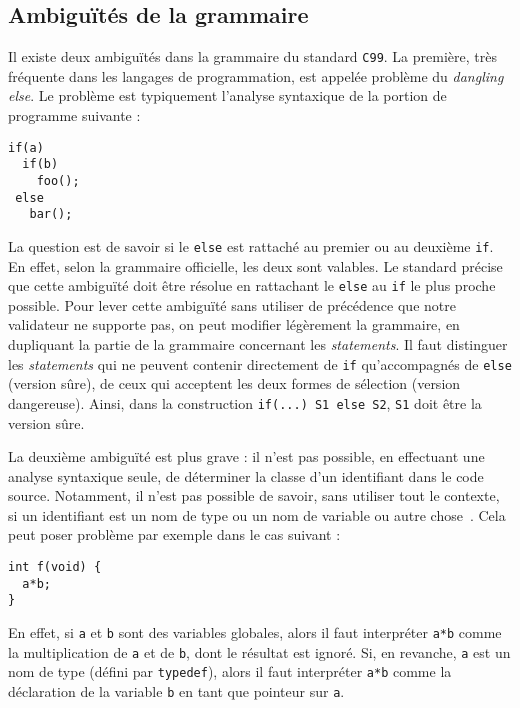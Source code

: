 \documentclass[a4paper,11pt]{article}
\begin{document}
\subsection{Ambiguïtés de la grammaire}

Il existe deux ambiguïtés dans la grammaire du standard \texttt{C99}. La
première, très fréquente dans les langages de programmation, est
appelée problème du \emph{dangling else}. Le problème est typiquement
l'analyse syntaxique de la portion de programme suivante :

\begin{verbatim}
if(a)
  if(b)
    foo();
 else
   bar();
\end{verbatim}

La question est de savoir si le \verb+else+ est rattaché au premier ou
au deuxième \verb+if+. En effet, selon la grammaire officielle, les
deux sont valables. Le standard précise que cette ambiguïté doit être
résolue en rattachant le \verb+else+ au \verb+if+ le plus proche
possible. Pour lever cette ambiguïté sans utiliser de précédence que
notre validateur ne supporte pas, on peut modifier légèrement la
grammaire, en dupliquant la partie de la grammaire concernant les
\emph{statements}. Il faut distinguer les \emph{statements} qui
ne peuvent contenir directement de \verb+if+ qu'accompagnés de
\verb+else+ (version sûre), de ceux qui acceptent les deux formes de
sélection (version dangereuse). Ainsi, dans la construction
\verb+if(...) S1 else S2+, \verb+S1+ doit être la version sûre.

La deuxième ambiguïté est plus grave : il n'est pas possible, en
effectuant une analyse syntaxique seule, de déterminer la classe d'un
identifiant dans le code source. Notamment, il n'est pas possible de
savoir, sans utiliser tout le contexte, si un identifiant est un nom
de type ou un nom de variable ou autre chose~\cite{lexerhack}. Cela
peut poser problème par exemple dans le cas suivant :

\begin{verbatim}
int f(void) {
  a*b;
}
\end{verbatim}

En effet, si \verb+a+ et \verb+b+ sont des variables globales, alors
il faut interpréter \verb+a*b+ comme la multiplication de \verb+a+ et
de \verb+b+, dont le résultat est ignoré. Si, en revanche, \verb+a+
est un nom de type (défini par \verb+typedef+), alors il faut
interpréter \verb+a*b+ comme la déclaration de la variable \verb+b+ en
tant que pointeur sur \verb+a+.
\end{document}
